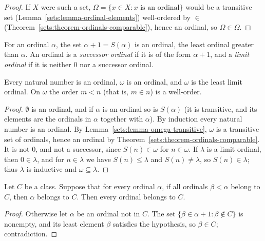 \begin{proof}
If $X$ were such a set, $\Omega = \{x \in X : x \text{ is an ordinal}\}$ would
be a transitive set (Lemma~\ref{sets:lemma-ordinal-elements}) well-ordered by
$\in$ (Theorem~\ref{sets:theorem-ordinals-comparable}), hence an ordinal, so
$\Omega \in \Omega$.
\end{proof}

\begin{definition}\label{sets:definition-successor-limit}
For an ordinal $\alpha$, the set $\alpha + 1 = S(\alpha)$ is an ordinal, the
least ordinal greater than $\alpha$. An ordinal is a \emph{successor ordinal}
if it is of the form $\alpha + 1$, and a \emph{limit ordinal} if it is neither
$0$ nor a successor ordinal.
\end{definition}

\begin{proposition}\label{sets:proposition-omega-ordinal}
Every natural number is an ordinal, $\omega$ is an ordinal, and $\omega$ is the
least limit ordinal. On $\omega$ the order $m < n$ (that is, $m \in n$) is a
well-order.
\end{proposition}

\begin{proof}
$\emptyset$ is an ordinal, and if $\alpha$ is an ordinal so is $S(\alpha)$ (it
is transitive, and its elements are the ordinals in $\alpha$ together with
$\alpha$). By induction every natural number is an ordinal. By
Lemma~\ref{sets:lemma-omega-transitive}, $\omega$ is a transitive set of
ordinals, hence an ordinal by Theorem~\ref{sets:theorem-ordinals-comparable}.
It is not $0$, and not a successor, since $S(n) \in \omega$ for $n \in \omega$.
If $\lambda$ is a limit ordinal, then $0 \in \lambda$, and for $n \in \lambda$ we
have $S(n) \leq \lambda$ and $S(n) \neq \lambda$, so $S(n) \in \lambda$; thus
$\lambda$ is inductive and $\omega \subseteq \lambda$.
\end{proof}

\begin{theorem}\label{sets:theorem-transfinite-induction}
Let $C$ be a class. Suppose that for every ordinal $\alpha$, if all ordinals
$\beta < \alpha$ belong to $C$, then $\alpha$ belongs to $C$. Then every
ordinal belongs to $C$.
\end{theorem}

\begin{proof}
Otherwise let $\alpha$ be an ordinal not in $C$. The set
$\{\beta \in \alpha + 1 : \beta \notin C\}$ is nonempty, and its least element
$\beta$ satisfies the hypothesis, so $\beta \in C$; contradiction.
\end{proof}

